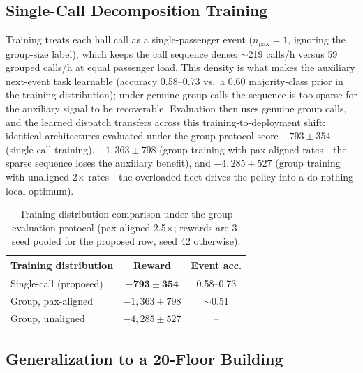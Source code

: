 \documentclass{ieeeaccess}
\begin{document}
\subsection{Single-Call Decomposition Training}

Training treats each hall call as a single-passenger event
($n_{\text{pax}} = 1$, ignoring the group-size label), which keeps
the call sequence dense: $\sim$219 calls/h versus 59 grouped
calls/h at equal passenger load. This density is what makes the
auxiliary next-event task learnable (accuracy 0.58--0.73 vs.~a 0.60
majority-class prior in the training distribution); under genuine group calls the sequence is too sparse for the
auxiliary signal to be recoverable. Evaluation then uses genuine
group calls, and the learned dispatch transfers across this
training-to-deployment shift: identical architectures evaluated under
the group protocol score $-793 \pm 354$ (single-call training),
$-1{,}363 \pm 798$ (group training with pax-aligned rates---the
sparse sequence loses the auxiliary benefit), and $-4{,}285 \pm
527$ (group training with unaligned 2$\times$ rates---the overloaded
fleet drives the policy into a do-nothing local optimum).

\begin{table}[t]
\centering
\caption{Training-distribution comparison under the group evaluation
protocol (pax-aligned 2.5$\times$; rewards are 3-seed pooled for the
proposed row, seed 42 otherwise).}
\label{tab:train_dist}
\begin{tabular}{@{}lcc@{}}
\toprule
Training distribution & Reward & Event acc. \\
\midrule
Single-call (proposed) & $\mathbf{-793 \pm 354}$ & 0.58--0.73 \\
Group, pax-aligned & $-1{,}363 \pm 798$ & $\sim$0.51 \\
Group, unaligned & $-4{,}285 \pm 527$ & -- \\
\bottomrule
\end{tabular}
\end{table}

\subsection{Generalization to a 20-Floor Building}
\end{document}
